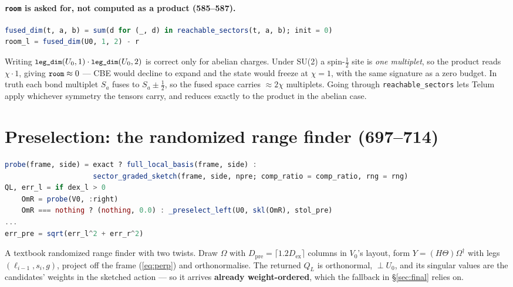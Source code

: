 \documentclass[11pt,a4paper]{article}
\newcommand{\code}[1]{\texttt{\small #1}}
\newcommand{\Dex}{D_{\mathrm{ex}}}
\newcommand{\Dpre}{D_{\mathrm{pre}}}
\begin{document}
\paragraph{\code{room} is asked for, not computed as a product (585--587).}
\begin{lstlisting}[language=Julia,firstnumber=585]
fused_dim(t, a, b) = sum(d for (_, d) in reachable_sectors(t, a, b); init = 0)
room_l = fused_dim(U0, 1, 2) - r
\end{lstlisting}
Writing $\code{leg\_dim}(U_0,1)\cdot\code{leg\_dim}(U_0,2)$ is correct only for abelian charges.
Under SU(2) a spin-$\tfrac12$ site is \emph{one multiplet}, so the product reads $\chi\cdot 1$,
giving $\code{room}\approx0$ --- CBE would decline to expand and the state would freeze at
$\chi=1$, with the same signature as a zero budget. In truth each bond multiplet $S_a$ fuses to
$S_a\pm\tfrac12$, so the fused space carries $\approx2\chi$ multiplets. Going through
\code{reachable\_sectors} lets Telum apply whichever symmetry the tensors carry, and reduces
exactly to the product in the abelian case.

\section{Preselection: the randomized range finder (697--714)}
\label{sec:sketch}

\begin{lstlisting}[language=Julia,firstnumber=697]
probe(frame, side) = exact ? full_local_basis(frame, side) :
                     sector_graded_sketch(frame, side, npre; comp_ratio = comp_ratio, rng = rng)
QL, err_l = if dex_l > 0
    OmR = probe(V0, :right)
    OmR === nothing ? (nothing, 0.0) : _preselect_left(U0, skl(OmR), stol_pre)
...
err_pre = sqrt(err_l^2 + err_r^2)
\end{lstlisting}

A textbook randomized range finder with two twists. Draw $\Omega$ with
$\Dpre=\lceil1.2\Dex\rceil$ columns in $V_0$'s layout, form $Y=(H\Theta)\Omega^\dagger$ with
legs $(\ell_{i-1},s_i,g)$, project off the frame (\eqref{eq:perp}) and orthonormalise. The
returned $Q_L$ is orthonormal, $\perp U_0$, and its singular values are the candidates' weights
in the sketched action --- so it arrives \textbf{already weight-ordered}, which the fallback in
\S\ref{sec:final} relies on.
\end{document}
